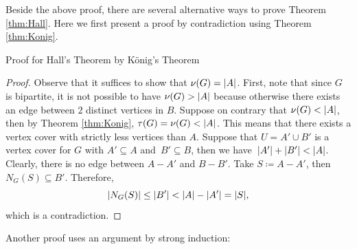 \documentclass[math]{amznotes}
\theoremstyle{remark}
\begin{document}
Beside the above proof, there are several alternative ways to prove Theorem \ref{thm:Hall}. Here we first present a proof by contradiction using Theorem \ref{thm:Konig}.
\begin{genbox}{Proof for Hall's Theorem by K\"{o}nig's Theorem}
    \begin{proof}
        Observe that it suffices to show that $\nu(G) = {\left\lvert {A} \right\rvert}$. First, note that since $G$ is bipartite, it is not possible to have $\nu(G) > {\left\lvert {A} \right\rvert}$ because otherwise there exists an edge between $2$ distinct vertices in $B$. Suppose on contrary that $\nu(G) < {\left\lvert {A} \right\rvert}$, then by Theorem \ref{thm:Konig}, $\tau(G) = \nu(G) < {\left\lvert {A} \right\rvert}$. This means that there exists a vertex cover with strictly less vertices than $A$. Suppose that $U = A' \cup B'$ is a vertex cover for $G$ with $A' \subseteq A$ and~$B' \subseteq B$, then we have~${\left\lvert {A'} \right\rvert} + {\left\lvert {B'} \right\rvert} < {\left\lvert {A} \right\rvert}$. Clearly, there is no edge between $A - A'$ and $B - B'$. Take $S \coloneqq A - A'$, then $N_G(S) \subseteq B'$. Therefore,
        \begin{equation*}
            {\left\lvert {N_G(S)} \right\rvert} \leq {\left\lvert {B'} \right\rvert} < {\left\lvert {A} \right\rvert} - {\left\lvert {A'} \right\rvert} = {\left\lvert {S} \right\rvert},
        \end{equation*}
        which is a contradiction.
    \end{proof}
\end{genbox}
Another proof uses an argument by strong induction:
\end{document}
